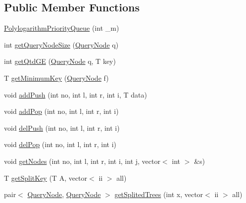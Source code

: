 \subsection*{Public Member Functions}
\begin{DoxyCompactItemize}
\item 
\hyperlink{classRetroactivity_1_1PolylogarithmPriorityQueue_ab925447d20c941a8f126d20c267052da}{Polylogarithm\+Priority\+Queue} (int \+\_\+m)
\item 
int \hyperlink{classRetroactivity_1_1PolylogarithmPriorityQueue_ade07f0238cb44def065cac46625b6f1f}{get\+Query\+Node\+Size} (\hyperlink{classRetroactivity_1_1PolylogarithmPriorityQueue_1_1QueryNode}{Query\+Node} q)
\item 
int \hyperlink{classRetroactivity_1_1PolylogarithmPriorityQueue_a4d118a35655e4bf4774a1fe1fdb0f884}{get\+Qtd\+GE} (\hyperlink{classRetroactivity_1_1PolylogarithmPriorityQueue_1_1QueryNode}{Query\+Node} q, T key)
\item 
T \hyperlink{classRetroactivity_1_1PolylogarithmPriorityQueue_a2ad9a9b51b4be420f0c5a65f6bcc3e41}{get\+Minimum\+Key} (\hyperlink{classRetroactivity_1_1PolylogarithmPriorityQueue_1_1QueryNode}{Query\+Node} f)
\item 
void \hyperlink{classRetroactivity_1_1PolylogarithmPriorityQueue_a87b978cc19aee60f21c55e2234e5730a}{add\+Push} (int no, int l, int r, int i, T data)
\item 
void \hyperlink{classRetroactivity_1_1PolylogarithmPriorityQueue_afc4926b8969ceb49e18eec4bcfedc054}{add\+Pop} (int no, int l, int r, int i)
\item 
void \hyperlink{classRetroactivity_1_1PolylogarithmPriorityQueue_a9963c071e40c6a3de73d23577598c321}{del\+Push} (int no, int l, int r, int i)
\item 
void \hyperlink{classRetroactivity_1_1PolylogarithmPriorityQueue_ac443672a0107e3ed713abb7532ae9664}{del\+Pop} (int no, int l, int r, int i)
\item 
void \hyperlink{classRetroactivity_1_1PolylogarithmPriorityQueue_a18cda73d1563529c27cf8533c7bcfde2}{get\+Nodes} (int no, int l, int r, int i, int j, vector$<$ int $>$ \&s)
\item 
T \hyperlink{classRetroactivity_1_1PolylogarithmPriorityQueue_a19a0f1350c94228d0a8d0e3bc8e6fd7f}{get\+Split\+Key} (T A, vector$<$ ii $>$ all)
\item 
pair$<$ \hyperlink{classRetroactivity_1_1PolylogarithmPriorityQueue_1_1QueryNode}{Query\+Node}, \hyperlink{classRetroactivity_1_1PolylogarithmPriorityQueue_1_1QueryNode}{Query\+Node} $>$ \hyperlink{classRetroactivity_1_1PolylogarithmPriorityQueue_acb5b4bb0403f953cae696fdd2db2e1e0}{get\+Splited\+Trees} (int x, vector$<$ ii $>$ all)

\end{DoxyCompactItemize}
